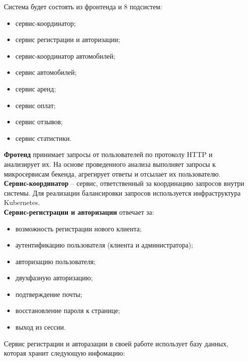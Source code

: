 Система будет состоять из фронтенда и 8 подсистем:
\begin{itemize}
	\item сервис-координатор;
	
	\item сервис регистрации и авторизации;
	
	\item сервис-координатор автомобилей;
	
	\item сервис автомобилей;
	
	\item сервис аренд;
	
	\item сервис оплат;
	
	\item сервис отзывов;
	
	\item сервис статистики.
\end{itemize}
%
\textbf{Фротенд} принимает запросы от пользователей по протоколу HTTP и анализирует их. На основе проведенного анализа выполняет запросы к микросервисам бекенда, агрегирует ответы и отсылает их пользователю. \\
\textbf{Сервис-координатор} -- сервис, ответственный за координацию запросов внутри системы. Для реализации балансировки запросов используется инфраструктура Kubernetes. \\
\textbf{Сервис-регистрации и авторизации} отвечает за:
\begin{itemize}
	\item возможность регистрации нового клиента;
	
	\item аутентификацию пользователя (клиента и администратора);
	
	\item авторизацию пользователя;
	
	\item двухфазную авторизацию;
	
	\item подтверждение почты;
	
	\item восстановление пароля к странице;
	
	\item выход из сессии.
\end{itemize}

Сервис регистрации и авторазации в своей работе использует базу данных, которая хранит следующую инфомацию:

